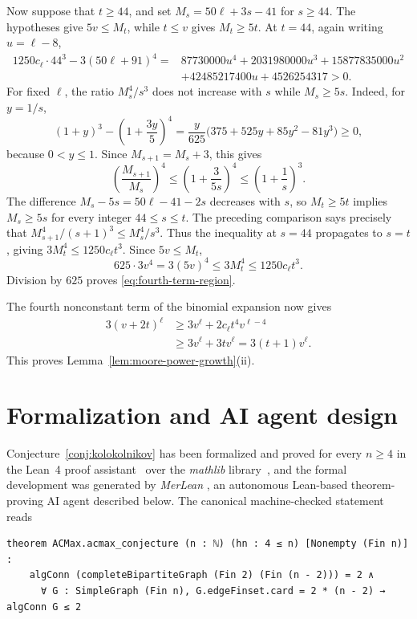 \documentclass[11pt]{article}
\numberwithin{equation}{section}
\theoremstyle{definition}
\theoremstyle{remark}
\begin{document}
Now suppose that \(t\ge44\), and set \(M_s=50\ell+3s-41\) for \(s\ge44\).
The hypotheses give \(5v\le M_t\), while \(t\le v\) gives \(M_t\ge5t\).
At \(t=44\), again writing \(u=\ell-8\),
\begin{align*}
1250c_\ell\cdot44^3-3(50\ell+91)^4
={}&87730000u^4+2031980000u^3+15877835000u^2\\
&+42485217400u+4526254317>0.
\end{align*}
For fixed \(\ell\), the ratio \(M_s^4/s^3\) does not increase with
\(s\) while \(M_s\ge5s\).  Indeed, for \(y=1/s\),
\[
 (1+y)^3-\left(1+\frac{3y}{5}\right)^4
 =\frac{y}{625}\bigl(375+525y+85y^2-81y^3\bigr)\ge0,
\]
because \(0<y\le1\).  Since \(M_{s+1}=M_s+3\), this gives
\[
 \left(\frac{M_{s+1}}{M_s}\right)^4
 \le\left(1+\frac{3}{5s}\right)^4
 \le\left(1+\frac1s\right)^3.
\]
The difference \(M_s-5s=50\ell-41-2s\) decreases with \(s\), so
\(M_t\ge5t\) implies \(M_s\ge5s\) for every integer \(44\le s\le t\).
The preceding comparison says precisely that
\(M_{s+1}^4/(s+1)^3\le M_s^4/s^3\).  Thus the inequality at \(s=44\)
propagates to \(s=t\), giving
\(3M_t^4\le1250c_\ell t^3\).  Since \(5v\le M_t\),
\[
 625\cdot3v^4=3(5v)^4\le3M_t^4\le1250c_\ell t^3.
\]
Division by \(625\) proves \eqref{eq:fourth-term-region}.

The fourth nonconstant term of the binomial expansion now gives
\[
\begin{aligned}
3(v+2t)^\ell
&\ge3v^\ell+2c_\ell t^4v^{\ell-4}\\
&\ge3v^\ell+3t v^\ell
 =3(t+1)v^\ell.
\end{aligned}
\]
This proves Lemma~\ref{lem:moore-power-growth}\textup{(ii)}.

\section{Formalization and AI agent design}
\label{sec:formalization}

Conjecture~\ref{conj:kolokolnikov} has been formalized and proved for every
\(n\ge4\) in the Lean~4 proof assistant~\cite{demoura2021} over the
\emph{mathlib} library~\cite{community2019leanmathematicallibrary}, and the formal development was
generated by \emph{MerLean} \cite{li2026merleanproverrecursiveloopingharness,ren2026merleanagenticframeworkautoformalization}, an autonomous Lean-based
theorem-proving AI agent described below.  The canonical machine-checked
statement reads

\begin{center}
\begin{minipage}{0.96\linewidth}
\small
\begin{verbatim}
theorem ACMax.acmax_conjecture (n : ℕ) (hn : 4 ≤ n) [Nonempty (Fin n)] :
    algConn (completeBipartiteGraph (Fin 2) (Fin (n - 2))) = 2 ∧
      ∀ G : SimpleGraph (Fin n), G.edgeFinset.card = 2 * (n - 2) → algConn G ≤ 2
\end{verbatim}
\end{minipage}
\end{center}
\end{document}
